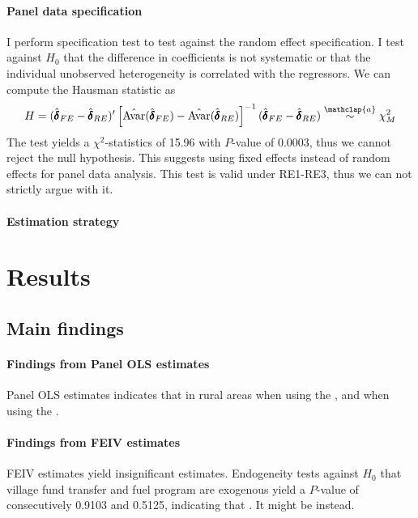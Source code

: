 \documentclass[letterpaper,12pt,leqno]{article}
\newcommand\asym{\stackrel{\mathclap{a}}{\sim}}
\newcommand{\Av}{\text{Avar}}
\begin{document}
\paragraph{Panel data specification} I perform \citet{hausman78} specification test to test against the random effect specification. I test against $H_0$ that the difference in coefficients is not systematic or that the individual unobserved heterogeneity is correlated with the regressors. We can compute the Hausman statistic as \begin{equation*}
        H=(\hat{\pmb{\delta}}_{FE}-\hat{\pmb{\delta}}_{RE})'\left[\hat{\Av}(\hat{\pmb{\delta}}_{FE})-\hat{\Av}(\hat{\pmb{\delta}}_{RE})\right]^{-1}(\hat{\pmb{\delta}}_{FE}-\hat{\pmb{\delta}}_{RE}) \asym \chi_M^2 \end{equation*}
The test yields a $\chi^2$-statistics of 15.96 with $P$-value of 0.0003, thus we cannot reject the null hypothesis. This suggests using fixed effects instead of random effects for panel data analysis. This test is valid under RE1-RE3, thus we can not strictly argue with it.

\paragraph{Estimation strategy}

\section{Results}\label{s:result}
\subsection{Main findings}\label{ss:findings}

\paragraph{Findings from Panel OLS estimates}
        Panel OLS estimates indicates that  in rural areas when using the , and  when using the . 
        
\paragraph{Findings from FEIV estimates}
        FEIV estimates yield insignificant estimates. Endogeneity tests against $H_0$ that village fund transfer and fuel program are exogenous yield a $P$-value of consecutively 0.9103 and 0.5125, indicating that . It might be  instead.
\end{document}
